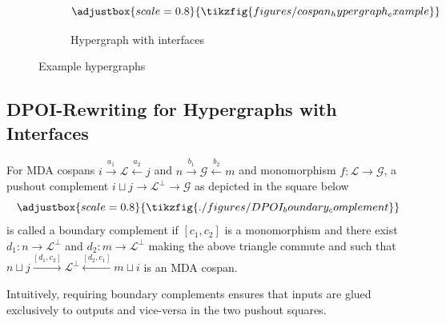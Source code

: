 \begin{figure}
\begin{subfigure}[c]{0.3\linewidth}
		\[
			\adjustbox{scale=0.8}{
				\tikzfig{figures/cospan_hypergraph_example}
			}
		\]
		\caption{Hypergraph with interfaces}%
		\label{fig:hypergraph-with-interfaces}
	\end{subfigure}
	\caption{Example hypergraphs}%
	\label{fig:hypergraph-examples}
\end{figure}

\subsection{DPOI-Rewriting for Hypergraphs with Interfaces}

\begin{defi}%
	\label{def:boundary_original}
	For MDA cospans $i \xrightarrow{a_1} \mathcal{L} \xleftarrow{a_2} j$ and $n \xrightarrow{b_1} \mathcal{G} \xleftarrow{b_2} m$ and monomorphism $f\colon \mathcal L \to \mathcal G$, a pushout complement $i \sqcup j \to \mathcal{L}^\bot \to \mathcal{G}$ as depicted in the square below
	\[
		\adjustbox{scale=0.8}{
			\tikzfig{./figures/DPOI_boundary_complement}
		}\]
	is called a boundary complement if $[c_1, c_2]$ is a monomorphism and there exist $d_1\colon n \to \mathcal{L}^{\bot}$ and $d_2\colon m \to \mathcal{L}^{\bot}$ making the above triangle commute and such that
	$
		n \sqcup j \xrightarrow{[d_1,c_2]} \mathcal{L}^{\bot} \xleftarrow{[d_2,c_1]} m \sqcup i
	$
	is an MDA cospan.
\end{defi}

Intuitively, requiring boundary complements ensures that inputs are glued exclusively to outputs and vice-versa in the two pushout squares.

